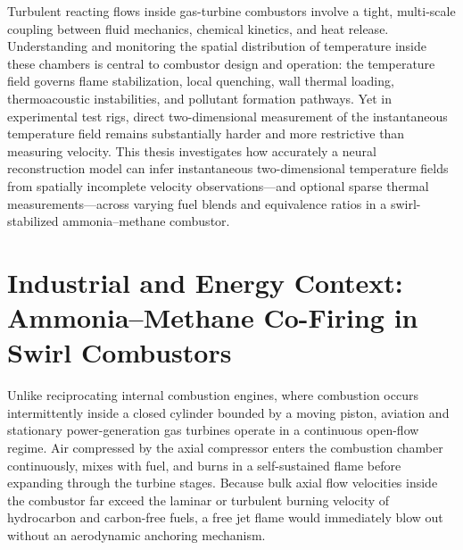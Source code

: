 
Turbulent reacting flows inside gas-turbine combustors involve a tight, multi-scale coupling between fluid mechanics, chemical kinetics, and heat release. Understanding and monitoring the spatial distribution of temperature inside these chambers is central to combustor design and operation: the temperature field governs flame stabilization, local quenching, wall thermal loading, thermoacoustic instabilities, and pollutant formation pathways. Yet in experimental test rigs, direct two-dimensional measurement of the instantaneous temperature field remains substantially harder and more restrictive than measuring velocity. This thesis investigates how accurately a neural reconstruction model can infer instantaneous two-dimensional temperature fields from spatially incomplete velocity observations---and optional sparse thermal measurements---across varying fuel blends and equivalence ratios in a swirl-stabilized ammonia--methane combustor.

\section{Industrial and Energy Context: Ammonia--Methane Co-Firing in Swirl Combustors}
\label{sec:intro_context}

Unlike reciprocating internal combustion engines, where combustion occurs intermittently inside a closed cylinder bounded by a moving piston, aviation and stationary power-generation gas turbines operate in a continuous open-flow regime. Air compressed by the axial compressor enters the combustion chamber continuously, mixes with fuel, and burns in a self-sustained flame before expanding through the turbine stages. Because bulk axial flow velocities inside the combustor far exceed the laminar or turbulent burning velocity of hydrocarbon and carbon-free fuels, a free jet flame would immediately blow out without an aerodynamic anchoring mechanism.

